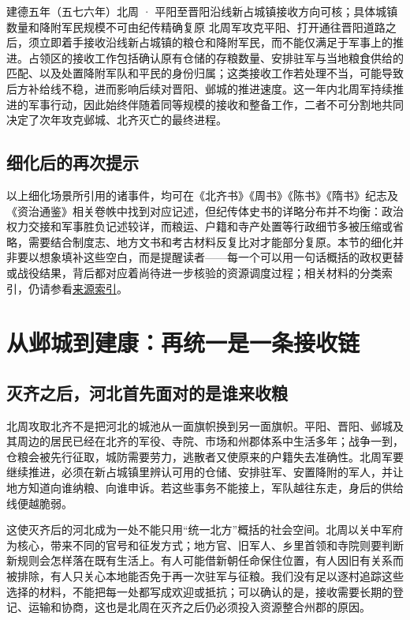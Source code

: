 \begin{event}{}{建德五年（五七六年）}{北周 · 平阳至晋阳沿线新占城镇}{接收方向可核；具体城镇数量和降附军民规模不可由纪传精确复原}
北周军攻克平阳、打开通往晋阳道路之后，须立即着手接收沿线新占城镇的粮仓和降附军民，而不能仅满足于军事上的推进。占领区的接收工作包括确认原有仓储的存粮数量、安排驻军与当地粮食供给的匹配、以及处置降附军队和平民的身份归属；这类接收工作若处理不当，可能导致后方补给线不稳，进而影响后续对晋阳、邺城的推进速度。这一年内北周军持续推进的军事行动，因此始终伴随着同等规模的接收和整备工作，二者不可分割地共同决定了次年攻克邺城、北齐灭亡的最终进程。
\end{event}

\subsection{细化后的再次提示}

以上细化场景所引用的诸事件，均可在《北齐书》《周书》《陈书》《隋书》纪志及《资治通鉴》相关卷帙中找到对应记述，但纪传体史书的详略分布并不均衡：政治权力交接和军事胜负记述较详，而粮运、户籍和寺产处置等行政细节多被压缩或省略，需要结合制度志、地方文书和考古材料反复比对才能部分复原。本节的细化并非要以想象填补这些空白，而是提醒读者——每一个可以用一句话概括的政权更替或战役结果，背后都对应着尚待进一步核验的资源调度过程；相关材料的分类索引，仍请参看\hyperref[app:sources]{来源索引}。

\section{从邺城到建康：再统一是一条接收链}

\subsection{灭齐之后，河北首先面对的是谁来收粮}

北周攻取北齐不是把河北的城池从一面旗帜换到另一面旗帜。平阳、晋阳、邺城及其周边的居民已经在北齐的军役、寺院、市场和州郡体系中生活多年；战争一到，仓粮会被先行征取，城防需要劳力，逃散者又使原来的户籍失去准确性。北周军要继续推进，必须在新占城镇里辨认可用的仓储、安排驻军、安置降附的军人，并让地方知道向谁纳粮、向谁申诉。若这些事务不能接上，军队越往东走，身后的供给线便越脆弱。

这使灭齐后的河北成为一处不能只用“统一北方”概括的社会空间。北周以关中军府为核心，带来不同的官号和征发方式；地方官、旧军人、乡里首领和寺院则要判断新规则会怎样落在既有生活上。有人可能借新朝任命保住位置，有人因旧有关系而被排除，有人只关心本地能否免于再一次驻军与征粮。我们没有足以逐村追踪这些选择的材料，不能把每一处都写成欢迎或抵抗；可以确认的是，接收需要长期的登记、运输和协商，这也是北周在灭齐之后仍必须投入资源整合州郡的原因。

